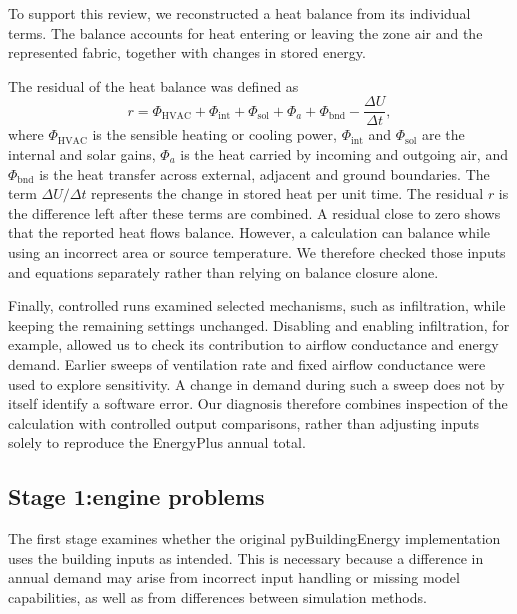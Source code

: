 \documentclass[12pt, a4paper]{article}
\begin{document}
To support this review, we reconstructed a heat balance from its individual terms. The balance accounts for heat entering or leaving the zone air and the represented fabric, together with changes in stored energy.

The residual of the heat balance was defined as
\begin{equation}
  r = \Phi_{\mathrm{HVAC}} + \Phi_{\mathrm{int}} + \Phi_{\mathrm{sol}}
      + \Phi_{a} + \Phi_{\mathrm{bnd}} - \frac{\Delta U}{\Delta t},
  \label{eq:residual}
\end{equation}
where $\Phi_{\mathrm{HVAC}}$ is the sensible heating or cooling power,
$\Phi_{\mathrm{int}}$ and $\Phi_{\mathrm{sol}}$ are the internal and solar
gains, $\Phi_{a}$ is the heat carried by incoming and outgoing air, and
$\Phi_{\mathrm{bnd}}$ is the heat transfer across external, adjacent and
ground boundaries. The term $\Delta U/\Delta t$ represents the change in
stored heat per unit time. The residual $r$ is the difference left after
these terms are combined. A residual close to zero shows that the reported
heat flows balance. However, a calculation can balance while using an
incorrect area or source temperature. We therefore checked those inputs and
equations separately rather than relying on balance closure alone.

Finally, controlled runs examined selected mechanisms, such as infiltration,
while keeping the remaining settings unchanged. Disabling and enabling
infiltration, for example, allowed us to check its contribution to airflow
conductance and energy demand. Earlier sweeps of ventilation rate and fixed
airflow conductance were used to explore sensitivity. A change in demand
during such a sweep does not by itself identify a software error. Our
diagnosis therefore combines inspection of the calculation with controlled
output comparisons, rather than adjusting inputs solely to reproduce the
EnergyPlus annual total. 

\subsection{Stage 1:engine problems}
\label{sec:engine problems}
The first stage examines whether the original pyBuildingEnergy implementation uses the building inputs as intended. This is necessary because a difference in annual demand may arise from incorrect input handling or missing model capabilities, as well as from differences between simulation methods. 
\end{document}
